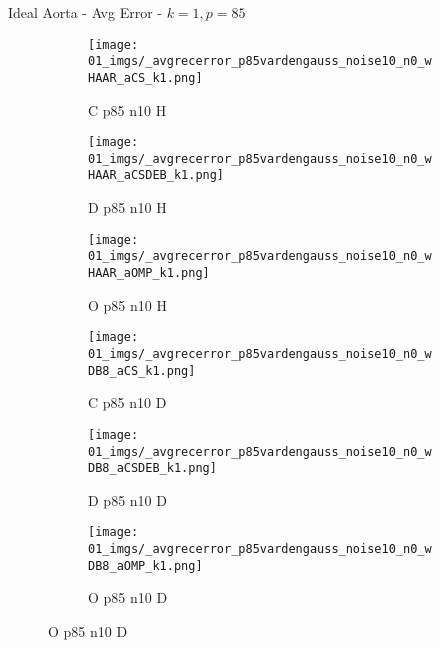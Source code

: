 \begin{frame}{Ideal Aorta - Avg Error - $k=1,p=85$}{}
\begin{figure}
\begin{subfigure}{0.13\textwidth}
\texttt{[image: 01\_imgs/\_avgrecerror\_p85vardengauss\_noise10\_n0\_wHAAR\_aCS\_k1.png]}
\caption*{\tiny C p85 n10 H}
\end{subfigure}
\begin{subfigure}{0.13\textwidth}
\texttt{[image: 01\_imgs/\_avgrecerror\_p85vardengauss\_noise10\_n0\_wHAAR\_aCSDEB\_k1.png]}
\caption*{\tiny D p85 n10 H}
\end{subfigure}
\begin{subfigure}{0.13\textwidth}
\texttt{[image: 01\_imgs/\_avgrecerror\_p85vardengauss\_noise10\_n0\_wHAAR\_aOMP\_k1.png]}
\caption*{\tiny O p85 n10 H}
\end{subfigure}
\begin{subfigure}{0.13\textwidth}
\texttt{[image: 01\_imgs/\_avgrecerror\_p85vardengauss\_noise10\_n0\_wDB8\_aCS\_k1.png]}
\caption*{\tiny C p85 n10 D}
\end{subfigure}
\begin{subfigure}{0.13\textwidth}
\texttt{[image: 01\_imgs/\_avgrecerror\_p85vardengauss\_noise10\_n0\_wDB8\_aCSDEB\_k1.png]}
\caption*{\tiny D p85 n10 D}
\end{subfigure}
\begin{subfigure}{0.13\textwidth}
\texttt{[image: 01\_imgs/\_avgrecerror\_p85vardengauss\_noise10\_n0\_wDB8\_aOMP\_k1.png]}
\caption*{\tiny O p85 n10 D}
\end{subfigure}

\vspace{5pt}


\end{figure}
\end{frame}
